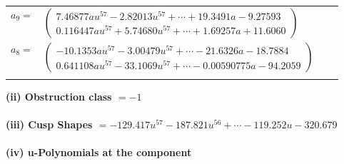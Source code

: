 \documentclass[1p]{elsarticle_modified}
\theoremstyle{definition}
\begin{document}
\begin{tabular}{m{7pt} m{180pt} m{7pt} m{180pt} }
\flushright $a_{9}=$&$\begin{pmatrix}7.46877 a u^{57}-2.82013 u^{57}+\cdots+19.3491 a-9.27593\\0.116447 a u^{57}+5.74680 u^{57}+\cdots+1.69257 a+11.6060\end{pmatrix}$ \\
\flushright $a_{8}=$&$\begin{pmatrix}-10.1353 a u^{57}-3.00479 u^{57}+\cdots-21.6326 a-18.7884\\0.641108 a u^{57}-33.1069 u^{57}+\cdots-0.00590775 a-94.2059\end{pmatrix}$\\&\end{tabular}
\flushleft \textbf{(ii) Obstruction class $= -1$}\\~\\
\flushleft \textbf{(iii) Cusp Shapes $= -129.417 u^{57}-187.821 u^{56}+\cdots-119.252 u-320.679$}\\~\\
\newpage\renewcommand{\arraystretch}{1}
\flushleft \textbf{(iv) u-Polynomials at the component}\newline \\
\end{document}

